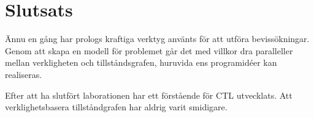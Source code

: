 \section{Slutsats}

Ännu en gång har prologs kraftiga verktyg använts för att utföra bevissökningar. Genom att skapa en modell för problemet går det med villkor dra paralleller mellan verkligheten och tillståndsgrafen, huruvida ens programidéer kan realiseras.

Efter att ha slutfört laborationen har ett förstående för CTL utvecklats. Att verklighetsbasera tillståndgrafen har aldrig varit smidigare. 
